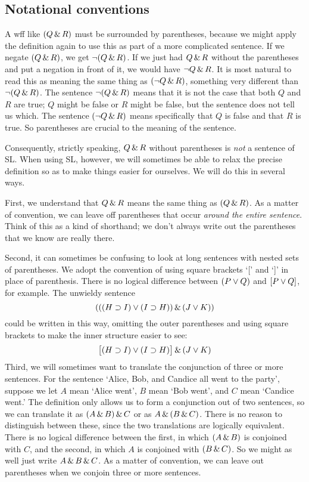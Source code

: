 \subsection{Notational conventions}
\label{SLconventions}
A wff like $(Q \,\&\, R)$ must be surrounded by parentheses, because we might apply the definition again to use this as part of a more complicated sentence. If we negate $(Q \,\&\, R)$, we get $\neg(Q \,\&\, R)$. If we just had $Q \,\&\, R$ without the parentheses and put a negation in front of it, we would have $\neg Q \,\&\, R$. It is most natural to read this as meaning the same thing as $(\neg Q \,\&\, R)$, something very different than $\neg(Q\,\&\, R)$. The sentence $\neg(Q \,\&\, R)$ means that it is not the case that both $Q$ and $R$ are true; $Q$ might be false or $R$ might be false, but the sentence does not tell us which. The sentence $(\neg Q \,\&\, R)$ means specifically that $Q$ is false and that $R$ is true. So parentheses are crucial to the meaning of the sentence.

Consequently, strictly speaking, $Q \,\&\, R$ without parentheses is \emph{not} a sentence of SL. When using SL, however, we will sometimes be able to relax the precise definition so as to make things easier for ourselves. We will do this in several ways.

First,  we understand that $Q \,\&\, R$ means the same thing as $(Q \,\&\, R)$. As a matter of convention, we can leave off parentheses that occur \emph{around the entire sentence}. Think of this as a kind of shorthand; we don't always write out the parentheses that we know are really there.

Second, it can sometimes be confusing to look at long sentences with nested sets of parentheses. We adopt the convention of using square brackets `[' and `]' in place of parenthesis. There is no logical difference between $(P\vee Q)$ and $[P\vee Q]$, for example. The unwieldy sentence
$$(((H \supset I) \vee (I \supset H)) \,\&\, (J \vee K))$$
could be written in this way, omitting the outer parentheses and using square brackets to make the inner structure easier to see:
$$\bigl[(H \supset I) \vee (I \supset H)\bigr] \,\&\, (J \vee K)$$
Third, we will sometimes want to translate the conjunction of three or more sentences. For the sentence `Alice, Bob, and Candice all went to the party', suppose we let $A$ mean `Alice went', $B$ mean `Bob went', and $C$ mean `Candice went.' The definition only allows us to form a conjunction out of two sentences, so we can translate it as $(A \,\&\, B) \,\&\, C$ or as $A \,\&\, (B \,\&\, C)$. There is no reason to distinguish between these, since the two translations are logically equivalent. There is no logical difference between the first, in which $(A \,\&\, B)$ is conjoined with $C$, and the second, in which $A$ is conjoined with $(B \,\&\, C)$.  So we might as well just write $A \,\&\, B \,\&\, C$. As a matter of convention, we can leave out parentheses when we conjoin three or more sentences.

